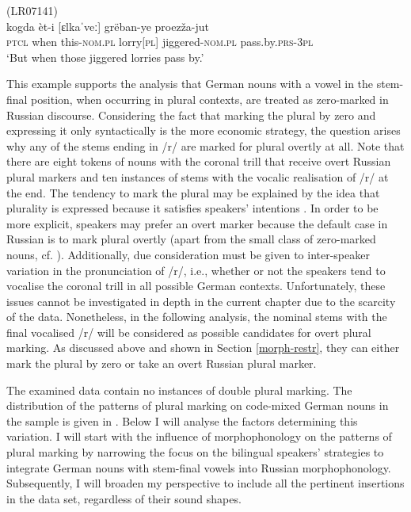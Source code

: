 \ea
\label{ex:6:17}
(LR07141)\\
 {kogda} {èt-i} [ɛlkaˈveː] {grëban-ye} {proezža-jut}\\
	\textsc{ptcl} when this-\textsc{nom.pl} lorry[\textsc{pl}] jiggered-\textsc{nom.pl} pass.by.\textsc{prs-3pl}\\
\glt `But when those jiggered lorries pass by.'
\z

\noindent This example supports the analysis that German nouns with a vowel in the stem-final position, when occurring in plural contexts, are treated as zero-marked in Russian discourse. Considering the fact that marking the plural by zero and expressing it only syntactically is the more economic strategy, the question arises why any of the stems ending in /r/ are marked for plural overtly at all. Note that there are eight tokens of nouns with the coronal trill that receive overt Russian plural markers and ten instances of stems with the vocalic realisation of /r/ at the end. The tendency to mark the plural may be explained by the idea that plurality is expressed because it satisfies speakers' intentions \citep[150]{myers-scotton-contact-2002}. In order to be more explicit, speakers may prefer an overt marker because the default case in Russian is to mark plural overtly (apart from the small class of zero-marked nouns, cf. \citealt[218]{zaliznjak02}). Additionally, due consideration must be given to inter-speaker variation in the pronunciation of /r/, i.e., whether or not the speakers tend to vocalise the coronal trill in all possible German contexts. Unfortunately, these issues cannot be investigated in depth in the current chapter due to the scarcity of the data. Nonetheless, in the following analysis, the nominal stems with the final vocalised /r/ will be considered as possible candidates for overt plural marking. As discussed above and shown in Section \ref{morph-restr}, they can either mark the plural by zero or take an overt Russian plural marker.

The examined data contain no instances of double plural marking. The distribution of the patterns of plural marking on code-mixed German nouns in the sample is given in . Below I will analyse the factors determining this variation. I will start with the influence of morphophonology on the patterns of plural marking by narrowing the focus on the bilingual speakers’ strategies to integrate German nouns with stem-final vowels into Russian morphophonology. Subsequently, I will broaden my perspective to include all the pertinent insertions in the data set, regardless of their sound shapes.


